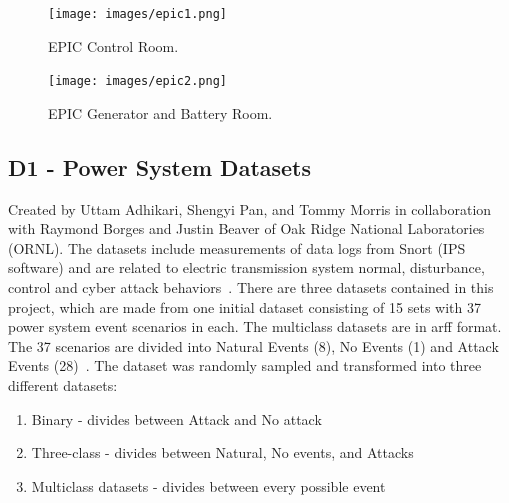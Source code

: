 \documentclass[english,12pt]{article}
\begin{document}
\begin{figure}[htb]
  \begin{centering}
      \texttt{[image: images/epic1.png]}
  \par\end{centering}
  \caption{\label{fig:epic1}EPIC Control Room.}
\end{figure}

\begin{figure}[!htb]
  \begin{centering}
      \texttt{[image: images/epic2.png]}
  \par\end{centering}
  \caption{\label{fig:epic2}EPIC Generator and Battery Room.}
\end{figure}


\subsection{D1 - Power System Datasets} \label{Power System Datasets}


Created by Uttam Adhikari, Shengyi Pan, and Tommy Morris in collaboration with Raymond Borges and Justin Beaver
of Oak Ridge National Laboratories (ORNL). The datasets include measurements of data logs from Snort (IPS software)
and are related to electric transmission system normal, disturbance, control and cyber attack behaviors~\cite{Tommymorris}. 
There are three datasets contained in this project, which are made from one initial dataset consisting of 15 sets
with 37 power system event scenarios in each. The multiclass datasets are in arff format. The 37 scenarios are
divided into Natural Events (8), No Events (1) and Attack Events (28)~\cite{6900095}. 
The dataset was randomly sampled and transformed into three different datasets:

\begin{enumerate}
  \item Binary - divides between Attack and No attack
  \item Three-class - divides between Natural, No events, and Attacks
  \item Multiclass datasets - divides between every possible event
\end{enumerate}
\end{document}
